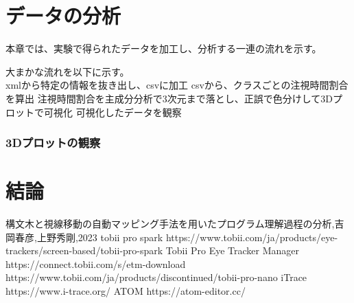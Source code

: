 \documentclass[paper=a4paper,fontsize=10pt]{jlreq}
\begin{document}
\clearpage

\part{データの分析}
  本章では、実験で得られたデータを加工し、分析する一連の流れを示す。
  
  大まかな流れを以下に示す。\\
  xmlから特定の情報を抜き出し、csvに加工
  csvから、クラスごとの注視時間割合を算出
  注視時間割合を主成分分析で3次元まで落とし、正誤で色分けして3Dプロットで可視化
  可視化したデータを観察

  \section{}
    

  \section{3Dプロットの観察}

\clearpage    

\part{結論}


\begin{thebibliography}{99}
   構文木と視線移動の自動マッピング手法を用いたプログラム理解過程の分析,吉岡春彦,上野秀剛,2023
   tobii pro spark https://www.tobii.com/ja/products/eye-trackers/screen-based/tobii-pro-spark
   Tobii Pro Eye Tracker Manager https://connect.tobii.com/s/etm-download
   https://www.tobii.com/ja/products/discontinued/tobii-pro-nano
   iTrace https://www.i-trace.org/
   ATOM https://atom-editor.cc/
\end{thebibliography}
\end{document}
